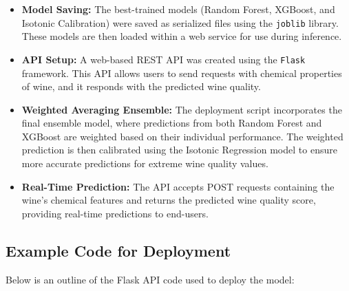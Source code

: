 \documentclass{article}
\begin{document}
\begin{itemize}
    \item \textbf{Model Saving:} The best-trained models (Random Forest, XGBoost, and Isotonic Calibration) were saved as serialized files using the \texttt{joblib} library. These models are then loaded within a web service for use during inference.
    \item \textbf{API Setup:} A web-based REST API was created using the \texttt{Flask} framework. This API allows users to send requests with chemical properties of wine, and it responds with the predicted wine quality.
    \item \textbf{Weighted Averaging Ensemble:} The deployment script incorporates the final ensemble model, where predictions from both Random Forest and XGBoost are weighted based on their individual performance. The weighted prediction is then calibrated using the Isotonic Regression model to ensure more accurate predictions for extreme wine quality values.
    \item \textbf{Real-Time Prediction:} The API accepts POST requests containing the wine’s chemical features and returns the predicted wine quality score, providing real-time predictions to end-users.
\end{itemize}

\subsection{Example Code for Deployment}
Below is an outline of the Flask API code used to deploy the model:
\end{document}
